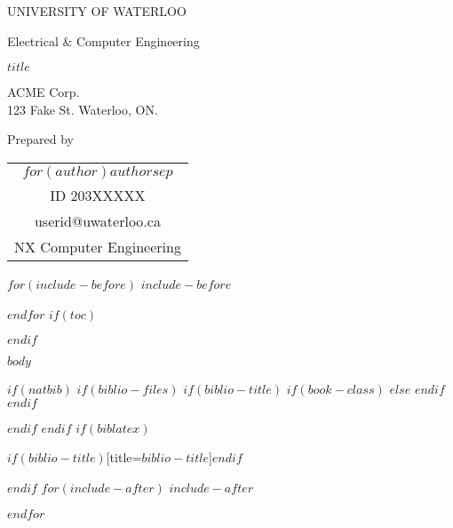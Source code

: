 \documentclass[$if(fontsize)$$fontsize$,$endif$$if(lang)$$lang$,$endif$]{$documentclass$}
\date{$date$}
\makeatletter
\renewcommand{\maketitle}{%
  \begin{titlepage}
  \begin{singlespacing}
  \let\footnotesize\small
  \let\footnoterule\relax
  \let\footnote\thanks
  \begin{center}
    {\large \MakeTextUppercase{University of Waterloo} \par Electrical \& Computer Engineering}%
  \end{center}
  \null\vfill
  \begin{center}
      {\LARGE  \par}{\huge \MakeTextUppercase{$title$} \par}%
  \end{center}\par
  \null\vfill
  \begin{center}
    {\large ACME Corp.\\ 123 Fake St. Waterloo, ON.}
  \end{center}\par
  \null\vfill
  \begin{center}
    \large Prepared by\\
      \begin{tabular}[t]{c}
        $for(author)$$author$$sep$ \and $endfor$ \\
          ID 203XXXXX \\ userid@uwaterloo.ca\\ NX Computer Engineering
      \end{tabular}
      \par
    \date{$date$}
  \end{center}
  \end{singlespacing}
  \end{titlepage}
}
\makeatother
\begin{document}
\maketitle
\thispagestyle{empty}

\setcounter{page}{1}

$for(include-before)$
$include-before$

$endfor$
$if(toc)$
{

\clearpage
\hypersetup{linkcolor=black}

\begin{singlespacing}{%
\setlength{\parskip}{0pt}

\tableofcontents

\clearpage
\listoffigures
{}
\pagebreak

\clearpage
\listoftables
{}
\pagebreak
}
\end{singlespacing}

}
$endif$

\setcounter{page}{1}
$body$


$if(natbib)$
$if(biblio-files)$
$if(biblio-title)$
$if(book-class)$
\renewcommand\bibname{$biblio-title$}
$else$
\renewcommand\refname{$biblio-title$}
$endif$
$endif$

$endif$
$endif$
$if(biblatex)$

\begin{singlespacing}
\clearpage
\hypersetup{linkcolor=black}
\printbibliography$if(biblio-title)$[title=$biblio-title$]$endif$
\clearpage
\end{singlespacing}

$endif$
$for(include-after)$
$include-after$

$endfor$
\end{document}
